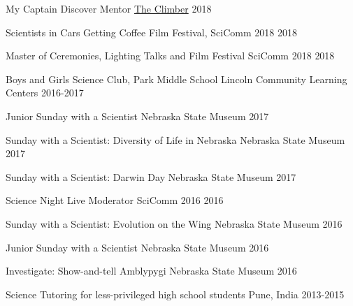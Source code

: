 

\begin{cvoutreaches}

 \cvoutreach
    {My Captain Discover Mentor}
    {\href{https://www.mycaptain.in/}{The Climber}}
    {2018}
    
 \cvoutreach
    {Scientists in Cars Getting Coffee}
    {Film Festival, SciComm 2018}
    {2018}
 
 \cvoutreach
    {Master of Ceremonies, Lighting Talks and Film Festival}
    {SciComm 2018}
    {2018}
     
  \cvoutreach
    {Boys and Girls Science Club, Park Middle School}
    {Lincoln Community Learning Centers}
    {2016-2017}
    
  \cvoutreach
    {Junior Sunday with a Scientist}
    {Nebraska State Museum}
    {2017}
    
   \cvoutreach
     {Sunday with a Scientist: Diversity of Life in Nebraska}
     {Nebraska State Museum}
     {2017}
     
   \cvoutreach
     {Sunday with a Scientist: Darwin Day}
     {Nebraska State Museum}
     {2017}
     
   \cvoutreach
     {Science Night Live Moderator}
     {SciComm 2016}
     {2016}
 
   \cvoutreach
     {Sunday with a Scientist: Evolution on the Wing}
     {Nebraska State Museum}
     {2016}
     
   \cvoutreach
     {Junior Sunday with a Scientist}
     {Nebraska State Museum}
     {2016}
     
   \cvoutreach
     {Investigate: Show-and-tell Amblypygi}
     {Nebraska State Museum}
     {2016}
     
  \cvoutreach
     {Science Tutoring for less-privileged high school students}
     {Pune, India}
     {2013-2015}
     
\end{cvoutreaches}
